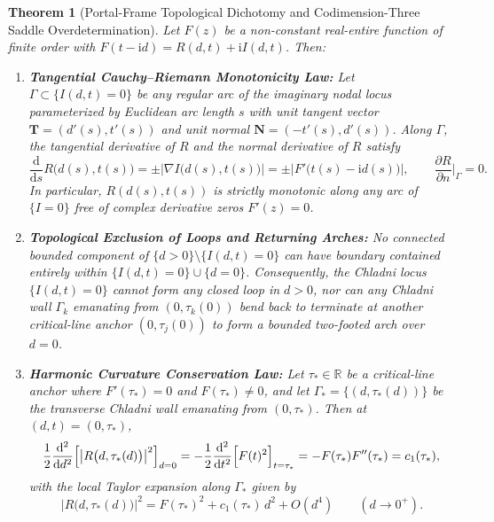 \documentclass[11pt,reqno]{amsart}
\newtheorem{theorem}{Theorem}[section]
\theoremstyle{definition}
\theoremstyle{remark}
\numberwithin{equation}{section}
\newcommand{\dd}{\mathrm{d}}
\newcommand{\ii}{\mathrm{i}}
\begin{document}
\begin{theorem}[Portal-Frame Topological Dichotomy and Codimension-Three Saddle Overdetermination]\label{thm:portal-dichotomy}
Let $F(z)$ be a non-constant real-entire function of finite order with $F(t-\ii d)=R(d,t)+\ii I(d,t)$. Then:
\begin{enumerate}[label=\upshape(\alph*),leftmargin=2.2em]
\item \textbf{Tangential Cauchy--Riemann Monotonicity Law:} Let $\Gamma \subset \{I(d,t)=0\}$ be any regular arc of the imaginary nodal locus parameterized by Euclidean arc length $s$ with unit tangent vector $\mathbf{T} = (d'(s),t'(s))$ and unit normal $\mathbf{N} = (-t'(s),d'(s))$. Along $\Gamma$, the tangential derivative of $R$ and the normal derivative of $R$ satisfy
\begin{equation}\label{eq:tangential-CR}
\frac{\dd}{\dd s}R\bigl(d(s),t(s)\bigr) = \pm \bigl|\nabla I\bigl(d(s),t(s)\bigr)\bigr| = \pm \bigl|F'\bigl(t(s)-\ii d(s)\bigr)\bigr|, \qquad \frac{\partial R}{\partial n}\Big|_\Gamma = 0.
\end{equation}
In particular, $R(d(s),t(s))$ is strictly monotonic along any arc of $\{I=0\}$ free of complex derivative zeros $F'(z)=0$.
\item \textbf{Topological Exclusion of Loops and Returning Arches:} No connected bounded component of $\{d>0\} \setminus \{I(d,t)=0\}$ can have boundary contained entirely within $\{I(d,t)=0\} \cup \{d=0\}$. Consequently, the Chladni locus $\{I(d,t)=0\}$ cannot form any closed loop in $d>0$, nor can any Chladni wall $\Gamma_k$ emanating from $(0,\tau_k(0))$ bend back to terminate at another critical-line anchor $(0,\tau_j(0))$ to form a bounded two-footed arch over $d=0$.
\item \textbf{Harmonic Curvature Conservation Law:} Let $\tau_* \in \mathbb{R}$ be a critical-line anchor where $F'(\tau_*)=0$ and $F(\tau_*)\ne 0$, and let $\Gamma_* = \{(d,\tau_*(d))\}$ be the transverse Chladni wall emanating from $(0,\tau_*)$. Then at $(d,t)=(0,\tau_*)$,
\begin{equation}\label{eq:harmonic-curvature-conservation}
\frac{1}{2}\frac{\dd^2}{\dd d^2}\Bigl[\bigl|R\bigl(d,\tau_*(d)\bigr)\bigr|^2\Bigr]_{d=0} = -\frac{1}{2}\frac{\dd^2}{\dd t^2}\Bigl[F(t)^2\Bigr]_{t=\tau_*} = -F(\tau_*)F''(\tau_*) = c_1(\tau_*),
\end{equation}
with the local Taylor expansion along $\Gamma_*$ given by
\begin{equation}\label{eq:wall-taylor}
\bigl|R\bigl(d,\tau_*(d)\bigr)\bigr|^2 = F(\tau_*)^2 + c_1(\tau_*)\,d^2 + O(d^4) \qquad (d \to 0^+).

\end{equation}
\end{enumerate}
\end{theorem}
\end{document}
